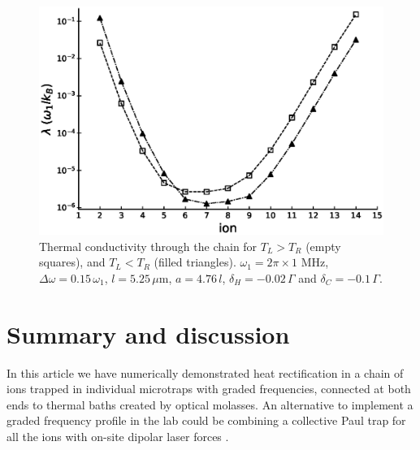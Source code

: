 \begin{figure}[t]
    \includegraphics[width=\linewidth]{Figures/fig_lambda_centered.eps}
    \caption{Thermal conductivity through the chain for $T_L > T_R$ (empty squares), and $T_L < T_R$ (filled triangles). $\omega_1 = 2 \pi \times 1$ MHz, $\Delta \omega = 0.15 \, \omega_1$, $l = 5.25\,\mu$m, $a = 4.76 \, l$, $\delta_H = -0.02 \,\Gamma$ and $\delta_C = -0.1 \, \Gamma$.}
    \label{fig:Thermal_conductivity}
\end{figure}
%
%
\section{Summary and discussion\label{ConclusionsRectificationChainOfIons}}
%
%
%
%
In this article we have numerically demonstrated heat rectification in a chain of ions trapped in individual microtraps with graded frequencies, connected at both ends to thermal baths
created by optical molasses. An alternative to implement a graded
frequency profile in the lab
could be combining a collective Paul trap for all the ions with on-site dipolar laser forces \cite{Freitas2015,Enderlein2012,Bermudez2013,Schneider2010}.

